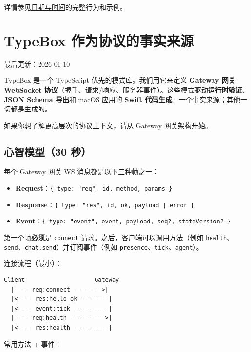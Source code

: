详情参见\href{/date-time}{日期与时间}的完整行为和示例。


\clearpage

\section{TypeBox 作为协议的事实来源}


最后更新：2026-01-10

TypeBox 是一个 TypeScript 优先的模式库。我们用它来定义 \textbf{Gateway 网关 WebSocket 协议}（握手、请求/响应、服务器事件）。这些模式驱动\textbf{运行时验证}、\textbf{JSON Schema 导出}和 macOS 应用的 \textbf{Swift 代码生成}。一个事实来源；其他一切都是生成的。

如果你想了解更高层次的协议上下文，请从 \href{/concepts/architecture}{Gateway 网关架构}开始。

\subsection{心智模型（30 秒）}


每个 Gateway 网关 WS 消息都是以下三种帧之一：

\begin{itemize}
  \item \textbf{Request}：\texttt{\{ type: "req", id, method, params \}}
  \item \textbf{Response}：\texttt{\{ type: "res", id, ok, payload | error \}}
  \item \textbf{Event}：\texttt{\{ type: "event", event, payload, seq?, stateVersion? \}}
\end{itemize}


第一个帧\textbf{必须}是 \texttt{connect} 请求。之后，客户端可以调用方法（例如 \texttt{health}、\texttt{send}、\texttt{chat.send}）并订阅事件（例如 \texttt{presence}、\texttt{tick}、\texttt{agent}）。

连接流程（最小）：

\begin{lstlisting}
Client                    Gateway
  |---- req:connect -------->|
  |<---- res:hello-ok --------|
  |<---- event:tick ----------|
  |---- req:health ---------->|
  |<---- res:health ----------|
\end{lstlisting}


常用方法 + 事件：


